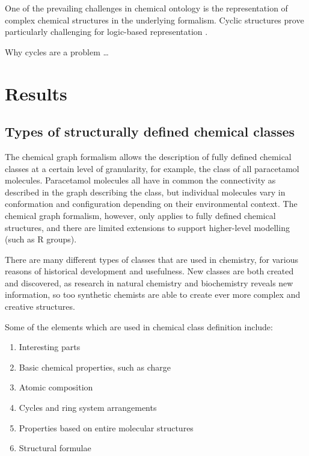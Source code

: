 \documentclass[10pt]{bmc_article}
\newenvironment{bmcformat}{\baselineskip20pt\sloppy\setboolean{publ}{false}}{\baselineskip20pt\sloppy}
\begin{document}
\begin{bmcformat}
One of the prevailing challenges in chemical ontology is the representation of complex chemical structures in the underlying formalism. Cyclic structures prove particularly challenging for logic-based representation \cite{magka2010}.  

Why cycles are a problem \ldots




\section*{Results}

\subsection*{Types of structurally defined chemical classes}
\label{sec:resultsclasses}

The chemical graph formalism \cite{trinajstic1992}allows the description of fully defined chemical classes at a certain level of granularity, for example, the class of all paracetamol molecules.  Paracetamol molecules all have in common the connectivity as described in the graph describing the class, but individual molecules vary in conformation and configuration depending on their environmental context. The chemical graph formalism, however, only applies to fully defined chemical structures, and there are limited extensions to support higher-level modelling (such as R groups). 

There are many different types of classes that are used in chemistry, for various reasons of historical development and usefulness. New classes are both created and discovered, as research in natural chemistry and biochemistry reveals new information, so too synthetic chemists are able to create ever more complex and creative structures.

Some of the elements which are used in chemical class definition include: 
\begin{enumerate}
	\item	Interesting parts
	\item	Basic chemical properties, such as charge
	\item	Atomic composition
	\item	Cycles and ring system arrangements
	\item	Properties based on entire molecular structures
	\item	Structural formulae
\end{enumerate}


\end{bmcformat}
\end{document}
